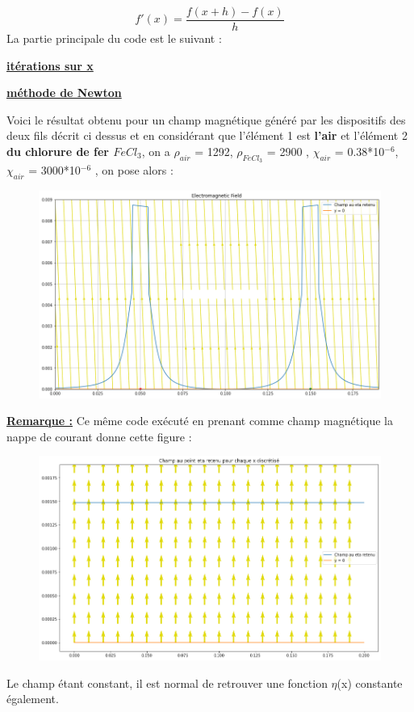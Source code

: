 \documentclass[10pt,a4paper]{article}
\begin{document}
\begin{equation}
f\prime(x) = \frac{f(x + h) - f(x)}{h}
\label{eq05}
\end{equation}
La partie principale du code est le suivant :

\begin{center}
\underline{\textbf{itérations sur x}}
\end{center}

\begin{center}
\underline{\textbf{méthode de Newton}}
\end{center}
Voici le résultat obtenu pour un champ magnétique généré par les dispositifs des deux fils décrit ci dessus et en considérant que l'élément 1 est \textbf{l'air} et l'élément 2 \textbf{du chlorure de fer $FeCl_{3}$}, on a $\rho_{air}$ = 1292,  $\rho_{FeCl_{3}}$ = 2900 \cite{site7}, $\chi_{air}$ = 0.38*10$^{-6}$, $\chi_{air}$ = 3000*10$^{-6}$ \cite{site8} , on pose alors : \\
\begin{figure}[h]
	\centering
    \includegraphics[width=.6\linewidth]{img_yamato/Hauteur.png}
\end{figure}
\newpage
\textbf{\underline{Remarque :}} Ce même code exécuté en prenant comme champ magnétique la nappe de courant donne cette figure :

\begin{figure}[h]
	\centering
    \includegraphics[width=.6\linewidth]{img_yamato/Nappe_plot.png}
\end{figure}
Le champ étant constant, il est normal de retrouver une fonction $\eta$(x) constante également.
\end{document}
